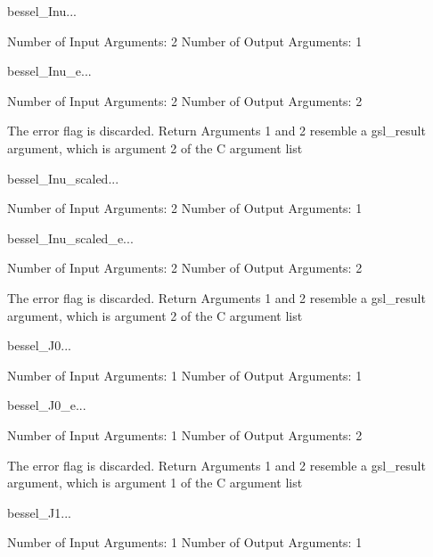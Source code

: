 \begin{funcdesc}{bessel_Inu}{...}

    Number of Input  Arguments:  2
    Number of Output Arguments:  1
\end{funcdesc}

\begin{funcdesc}{bessel_Inu_e}{...}

    Number of Input  Arguments:  2
    Number of Output Arguments:  2

The error flag is discarded.
Return Arguments 1 and 2 resemble a gsl_result argument,
	which is  argument 2 of the C argument list

\end{funcdesc}

\begin{funcdesc}{bessel_Inu_scaled}{...}

    Number of Input  Arguments:  2
    Number of Output Arguments:  1
\end{funcdesc}

\begin{funcdesc}{bessel_Inu_scaled_e}{...}

    Number of Input  Arguments:  2
    Number of Output Arguments:  2

The error flag is discarded.
Return Arguments 1 and 2 resemble a gsl_result argument,
	which is  argument 2 of the C argument list

\end{funcdesc}

\begin{funcdesc}{bessel_J0}{...}

    Number of Input  Arguments:  1
    Number of Output Arguments:  1
\end{funcdesc}

\begin{funcdesc}{bessel_J0_e}{...}

    Number of Input  Arguments:  1
    Number of Output Arguments:  2

The error flag is discarded.
Return Arguments 1 and 2 resemble a gsl_result argument,
	which is  argument 1 of the C argument list

\end{funcdesc}

\begin{funcdesc}{bessel_J1}{...}

    Number of Input  Arguments:  1
    Number of Output Arguments:  1
\end{funcdesc}

